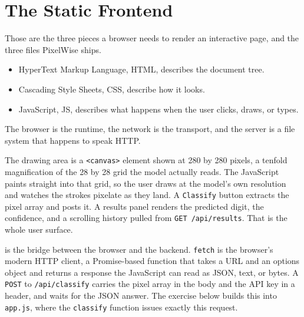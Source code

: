 \newpage
\section{The Static Frontend}

Those are the three pieces a browser needs to render an interactive page,
and the three files PixelWise ships.
\begin{itemize}
    \item HyperText Markup Language, HTML, describes the document tree.
    \item Cascading Style Sheets, CSS, describe how it looks.
    \item JavaScript, JS, describes what happens when the user clicks,
    draws, or types.
\end{itemize}
The browser is the runtime, the network is the transport, and the server
is a file system that happens to speak HTTP.


The drawing area is a \texttt{<canvas>} element shown at 280 by 280
pixels, a tenfold magnification of the 28 by 28 grid the model actually
reads.
The JavaScript paints straight into that grid, so the user draws at the
model's own resolution and watches the strokes pixelate as they land.
A \texttt{Classify} button extracts the pixel array and posts it.
A results panel renders the predicted digit, the confidence, and a
scrolling history pulled from \texttt{GET /api/results}.
That is the whole user surface.

 is the bridge between the browser
and the backend.
\texttt{fetch} is the browser's modern HTTP client, a Promise-based
function that takes a URL and an options object and returns a response
the JavaScript can read as JSON, text, or bytes.
A \texttt{POST} to \texttt{/api/classify} carries the pixel array in
the body and the API key in a header, and waits for the JSON answer.
The exercise below builds this into \texttt{app.js}, where the
\texttt{classify} function issues exactly this request.

